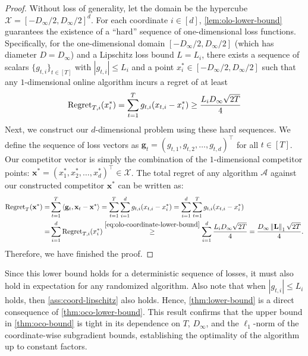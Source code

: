 \documentclass{article}
\def \x {\mathbf{x}}
\def \g {\mathbf{g}}
\def \A {\mathcal{A}}
\def \Lb {\mathbf{L}}
\def \X {\mathcal{X}}
\newcommand{\inner}[2]{\left\langle #1, #2 \right\rangle}
\newcommand{\norm}[1]{\left\Vert#1\right\Vert}
\newcommand{\abs}[1]{\left|#1\right|}
\begin{document}
\begin{proof}

Without loss of generality, let the domain be the hypercube $\X = [-D_\infty/2, D_\infty/2]^d$. For each coordinate $i \in [d]$, \cref{lem:olo-lower-bound} guarantees the existence of a ``hard'' sequence of one-dimensional loss functions. Specifically, for the one-dimensional domain $[-D_\infty/2, D_\infty/2]$ (which has diameter $D = D_\infty$) and a Lipschitz loss bound $L=L_i$, there exists a sequence of scalars $\{g_{t,i}\}_{t \in [T]}$ with $|g_{t,i}| \le L_i$ and a point $x_i^* \in [-D_\infty/2, D_\infty/2]$ such that any $1$-dimensional online algorithm incurs a regret of at least
\begin{equation}\label{eq:olo-coordinate-lower-bound}
    \textnormal{Regret}_{T,i}(x_i^*)=\sum_{t=1}^T g_{t,i} (x_{t,i} - x_i^*)\ge\frac{L_i D_\infty \sqrt{2T}}{4}
\end{equation}
Next, we construct our $d$-dimensional problem using these hard sequences. We define the sequence of loss vectors as $\g_t = (g_{t,1}, g_{t,2}, \dots, g_{t,d})^\top$ for all $t \in [T]$. Our competitor vector is simply the combination of the $1$-dimensional competitor points: $\x^* = (x_1^*, x_2^*, \dots, x_d^*)^\top \in \X$. The total regret of any algorithm $\A$ against our constructed competitor $\x^*$ can be written as:
\begin{align*}
    \textnormal{Regret}_T(\x^*) = &\sum_{t=1}^T \inner{\g_t}{\x_t - \x^*}=\sum_{t=1}^T \sum_{i=1}^d g_{t,i} (x_{t,i} - x_i^*)=\sum_{i=1}^d \sum_{t=1}^T g_{t,i} (x_{t,i} - x_i^*)\\=&\sum_{i=1}^d \textnormal{Regret}_{T,i}(x_i^*)\overset{\eqref{eq:olo-coordinate-lower-bound}}{\ge}\sum_{i=1}^d \frac{L_i D_\infty \sqrt{2T}}{4}= \frac{D_\infty \norm{\Lb}_1\sqrt{2T}}{4}.
\end{align*}
Therefore, we have finished the proof.
\end{proof}

Since this lower bound holds for a deterministic sequence of losses, it must also hold in expectation for any randomized algorithm. Also note that when $\abs{g_{t,i}}\le L_i$ holds, then \cref{ass:coord-lipschitz} also holds. Hence, \cref{thm:lower-bound} is a direct consequence of \cref{thm:oco-lower-bound}. This result confirms that the upper bound in \cref{thm:oco-bound} is tight in its dependence on $T$, $D_\infty$, and the $\ell_1$-norm of the coordinate-wise subgradient bounds, establishing the optimality of the algorithm up to constant factors.
\end{document}
